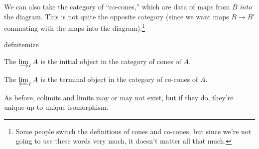 We can also take the category of ``co-cones,'' which are data of maps from \(B\) \emph{into} the diagram. This is
not quite the opposite category (since we want maps \(B\to B'\) commuting with the maps into the
diagram).\footnote{Some people switch the definitions of cones and co-cones, but since we're not going to use these
words very much, it doesn't matter all that much.}
\begin{comp}{defn}{itemize}
	\item The  \(\varinjlim_I A\) is the initial object in the category of cones of \(A\).
	\item The  \(\varprojlim_I A\) is the terminal object in the category of co-cones of \(A\).
\end{comp}
As before, colimits and limits may or may not exist, but if they do, they're unique up to unique isomorphism.

